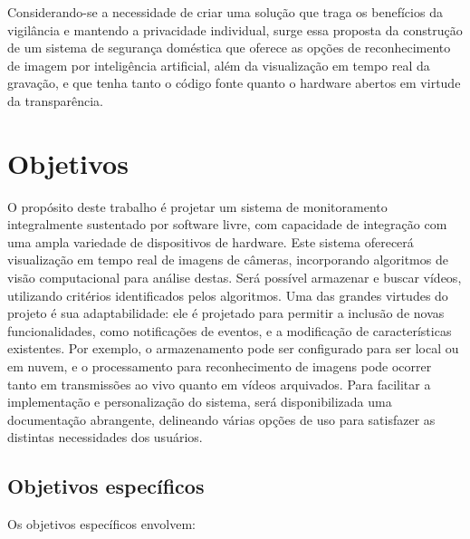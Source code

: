 \documentclass[12pt, %
openright, 
oneside, %
a4paper,    %
brazil]{facom-ufu-abntex2}
\begin{document}
Considerando-se a necessidade de criar uma solução que traga os benefícios da
vigilância e mantendo a privacidade individual, surge essa proposta da
construção de um sistema de segurança doméstica que oferece as opções de
reconhecimento de imagem por inteligência artificial, além da visualização em
tempo real da gravação, e que tenha tanto o código fonte quanto o hardware
abertos em virtude da transparência.

\section{Objetivos}

O propósito deste trabalho é projetar um sistema de monitoramento integralmente
sustentado por software livre, com capacidade de integração com uma ampla
variedade de dispositivos de hardware. Este sistema oferecerá visualização em
tempo real de imagens de câmeras, incorporando algoritmos de visão
computacional para análise destas. Será possível armazenar e buscar vídeos,
utilizando critérios identificados pelos algoritmos. Uma das grandes virtudes
do projeto é sua adaptabilidade: ele é projetado para permitir a inclusão de
novas funcionalidades, como notificações de eventos, e a modificação de
características existentes. Por exemplo, o armazenamento pode ser configurado
para ser local ou em nuvem, e o processamento para reconhecimento de imagens
pode ocorrer tanto em transmissões ao vivo quanto em vídeos arquivados. Para
facilitar a implementação e personalização do sistema, será disponibilizada uma
documentação abrangente, delineando várias opções de uso para satisfazer as
distintas necessidades dos usuários.

\subsection{Objetivos específicos}

Os objetivos específicos envolvem:
\end{document}
